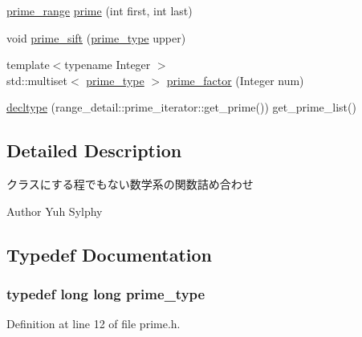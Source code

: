 \begin{DoxyCompactItemize}
\item 
\hyperlink{classyuh_1_1prime__range}{prime\-\_\-range} \hyperlink{namespaceyuh_a31e810e0c57ef83ca515b12f1aac0bf3}{prime} (int first, int last)
\item 
void \hyperlink{namespaceyuh_ac7fcc7fa46bf6b7cf12a53a653b23317}{prime\-\_\-sift} (\hyperlink{namespaceyuh_af542f8440602da42322ddb7ea8242336}{prime\-\_\-type} upper)
\item 
{\footnotesize template$<$typename Integer $>$ }\\std\-::multiset$<$ \hyperlink{namespaceyuh_af542f8440602da42322ddb7ea8242336}{prime\-\_\-type} $>$ \hyperlink{namespaceyuh_afb5d08e183729831f760d6c2a27226d8}{prime\-\_\-factor} (\-Integer num)
\item 
\hyperlink{namespaceyuh_aef8d22260a5c6af5f37d206badfd3d4e}{decltype} (range\-\_\-detail\-::prime\-\_\-iterator\-::get\-\_\-prime()) get\-\_\-prime\-\_\-list()
\end{DoxyCompactItemize}


\subsection{\-Detailed \-Description}
クラスにする程でもない数学系の関数詰め合わせ \begin{DoxyAuthor}{\-Author}
\-Yuh \-Sylphy 
\end{DoxyAuthor}


\subsection{\-Typedef \-Documentation}
\hypertarget{namespaceyuh_af542f8440602da42322ddb7ea8242336}{
\subsubsection[{prime\-\_\-type}]{\setlength{\rightskip}{0pt plus 5cm}typedef long long {\bf prime\-\_\-type}}}\label{d5/d2b/namespaceyuh_af542f8440602da42322ddb7ea8242336}


\-Definition at line 12 of file prime.\-h.



